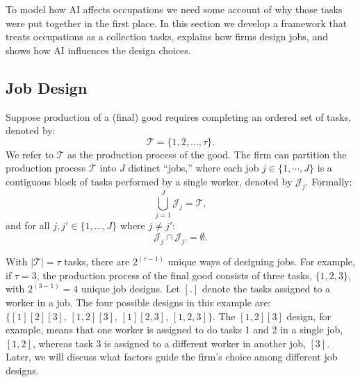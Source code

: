 \documentclass{article}
\theoremstyle{plain}
\theoremstyle{plain}
\begin{document}
To model how AI affects occupations we need some account of why those tasks were put together in the first place.
In this section we develop a framework that treats occupations as a collection tasks, explains how firms design jobs, and shows how AI influences the design choices.


\subsection{Job Design}
\label{sec:job_design}

Suppose production of a (final) good requires completing an ordered set of tasks, denoted by:
\begin{equation}
\label{eq:tasks}
\mathcal{T} = \{1,2,\ldots,\tau\}.
\end{equation}
We refer to $\mathcal{T}$ as the production process of the good.
The firm can partition the production process $\mathcal{T}$ into $J$ distinct ``jobs,'' where each job $j \in \{1, \cdots, J \}$ is a contiguous block of tasks performed by a single worker, denoted by $\mathcal{J}_j$.
Formally:
\[
\bigcup_{j=1}^J \mathcal{J}_j = \mathcal{T}, 
\]
and for all $j,j' \in \{1,\dots,J\}$ where $j \neq j'$:
\[
\mathcal{J}_j \cap \mathcal{J}_{j'} = \emptyset.
\]

With $|\mathcal{T}| = \tau$ tasks, there are $2^{(\tau - 1)}$ unique ways of designing jobs.
For example, if $\tau = 3$, the production process of the final good consists of three tasks, $\{1,2,3\}$, with $2^{(3-1)}=4$ unique job designs.
Let $[.]$ denote the tasks assigned to a worker in a job.
The four possible designs in this example are: $\{[1][2][3], \, [1,2][3], \, [1][2,3], \, [1,2,3]\}$.
The $[1,2][3]$ design, for example, means that one worker is assigned to do tasks 1 and 2 in a single job, $[1,2]$, whereas task 3 is assigned to a different worker in another job, $[3]$.
Later, we will discuss what factors guide the firm’s choice among different job designs.
\end{document}
